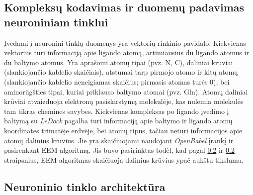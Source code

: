
\subsection{Kompleksų kodavimas ir duomenų padavimas neuroniniam tinklui}

Įvedami į neuronini tinklą duomenys yra vektorių rinkinio pavidalo. Kiekvienas vektorius turi informaciją apie ligando atomą, artimiausius du ligando atomus ir du baltymo atomus. Yra aprašomi atomų tipai (pvz. N, C), daliniai krūviai (slankiojančio kablelio skaičiais), atstumai tarp pirmojo atomo ir kitų atomų (slankiojančio kablelio neneigiamas skaičius; pirmasis atomas turės 0), bei aminorūgšties tipai, kuriai priklauso baltymo atomai (pvz. Gln). Atomų daliniai krūviai atvaizduoja elektronų pasiskirstymą molekulėje, kas nulemia molekulės tam tikras chemines savybes.
Kiekvienas kompleksas po ligando įvedimo į baltymą su \emph{LeDock} pagalba turi informaciją apie baltymo ir ligando atomų koordinates trimatėje erdvėje, bei atomų tipus, tačiau neturi informacijos apie atomų dalinius krūvius. Jie yra skaičiuojami naudojant \emph{OpenBabel} įrankį ir pasirenkant EEM algoritmą. %
Jis buvo pasirinktas todėl, kad pagal \ref{} ir \ref{} straipsnius, EEM algoritmas skaičiuoja dalinius krūvius ypač aukštu tikslumu.


%




\subsection{Neuroninio tinklo architektūra}

